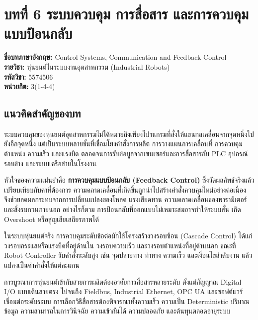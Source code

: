 \section{บทที่ 6 ระบบควบคุม การสื่อสาร และการควบคุมแบบป้อนกลับ}

\titleformat{\paragraph}[block]{\normalsize\bfseries\color{mainblue}}{}{0pt}{}
\titlespacing*{\paragraph}{0pt}{0.8em}{0.25em}

\textbf{ชื่อบทภาษาอังกฤษ:} Control Systems, Communication and Feedback Control \\
\textbf{รายวิชา:} หุ่นยนต์ในระบบงานอุตสาหกรรม (Industrial Robots) \\
\textbf{รหัสวิชา:} 5574506 \\
\textbf{หน่วยกิต:} 3(1-4-4) \\

\subsection{แนวคิดสำคัญของบท}

ระบบควบคุมของหุ่นยนต์อุตสาหกรรมไม่ได้หมายถึงเพียงโปรแกรมที่สั่งให้แขนกลเคลื่อนจากจุดหนึ่งไปยังอีกจุดหนึ่ง แต่เป็นระบบหลายชั้นที่เชื่อมโยงคำสั่งการผลิต การวางแผนการเคลื่อนที่ การควบคุมตำแหน่ง ความเร็ว และแรงบิด ตลอดจนการรับข้อมูลจากเซนเซอร์และการสื่อสารกับ PLC อุปกรณ์รอบข้าง และระบบเครือข่ายในโรงงาน

หัวใจของความแม่นยำคือ \textbf{การควบคุมแบบป้อนกลับ (Feedback Control)} ซึ่งวัดผลลัพธ์จริงแล้วเปรียบเทียบกับค่าที่ต้องการ ความคลาดเคลื่อนที่เกิดขึ้นถูกนำไปสร้างคำสั่งควบคุมใหม่อย่างต่อเนื่อง จึงช่วยลดผลกระทบจากการเปลี่ยนแปลงของโหลด แรงเสียดทาน ความคลาดเคลื่อนของพารามิเตอร์ และสิ่งรบกวนภายนอก อย่างไรก็ตาม การป้อนกลับที่ออกแบบไม่เหมาะสมอาจทำให้ระบบสั่น เกิด Overshoot หรือสูญเสียเสถียรภาพได้

ในระบบหุ่นยนต์จริง การควบคุมระดับข้อต่อมักใช้โครงสร้างวงรอบซ้อน (Cascade Control) ได้แก่ วงรอบกระแสหรือแรงบิดที่อยู่ด้านใน วงรอบความเร็ว และวงรอบตำแหน่งที่อยู่ด้านนอก ขณะที่ Robot Controller รับคำสั่งระดับสูง เช่น จุดปลายทาง ท่าทาง ความเร็ว และเงื่อนไขลำดับงาน แล้วแปลงเป็นค่าคำสั่งให้แต่ละแกน

การบูรณาการหุ่นยนต์เข้ากับสายการผลิตต้องอาศัยการสื่อสารหลายระดับ ตั้งแต่สัญญาณ Digital I/O แบบเดินสายตรง ไปจนถึง Fieldbus, Industrial Ethernet, OPC UA และซอฟต์แวร์เชื่อมต่อระดับระบบ การเลือกวิธีสื่อสารต้องพิจารณาทั้งความเร็ว ความเป็น Deterministic ปริมาณข้อมูล ความสามารถในการวินิจฉัย ความเข้ากันได้ ความปลอดภัย และต้นทุนตลอดอายุระบบ

